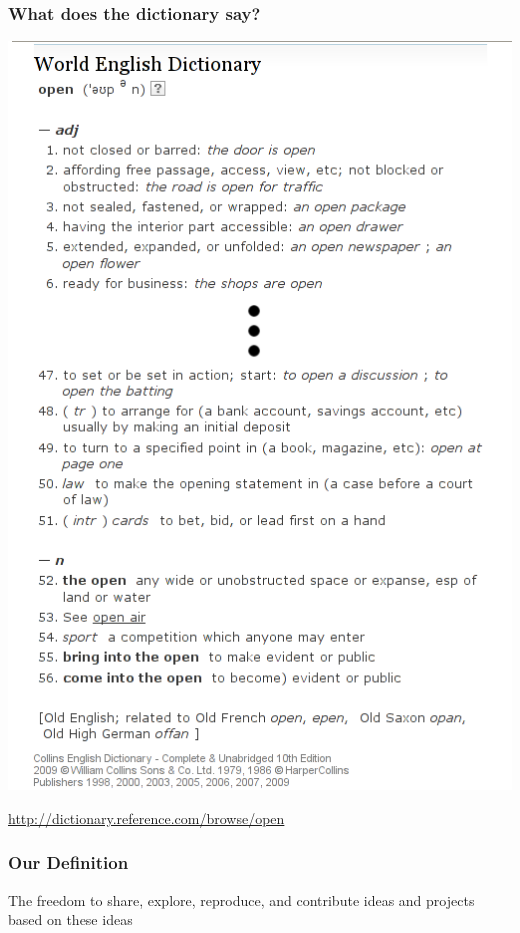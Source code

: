 \documentclass{beamer}
\begin{document}
\begin{frame}
  \frametitle{What does the dictionary say?}
  \begin{center}\includegraphics[height=0.8\textheight]{img/dictionary2}

    \href{http://dictionary.reference.com/browse/open}{http://dictionary.reference.com/browse/open}
  \end{center}
\end{frame}

\begin{frame}
  \frametitle{Our Definition}
  \begin{center}
    \begin{LARGE}
      The freedom to share, explore, reproduce, and contribute ideas and projects based on these ideas
    \end{LARGE}
\end{center}
\end{frame}
\end{document}
